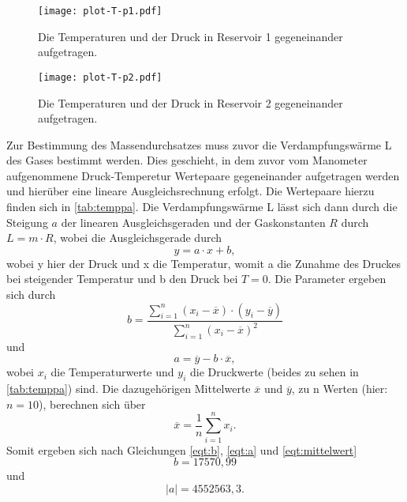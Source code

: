 

\begin{figure}
  \centering
  \texttt{[image: plot-T-p1.pdf]}
  \caption{Die Temperaturen und der Druck in Reservoir 1 gegeneinander aufgetragen.}
  \label{fig:plot_temp-druck1}
\end{figure}

\begin{figure}
  \centering
  \texttt{[image: plot-T-p2.pdf]}
  \caption{Die Temperaturen und der Druck in Reservoir 2 gegeneinander aufgetragen.}
  \label{fig:plot_temp-druck2}
\end{figure}

Zur Bestimmung des Massendurchsatzes muss zuvor die Verdampfungswärme L des Gases bestimmt werden. Dies geschieht, in dem zuvor vom Manometer aufgenommene
Druck-Temperetur Wertepaare gegeneinander aufgetragen werden und hierüber eine lineare Ausgleichsrechnung erfolgt. Die Wertepaare hierzu finden sich in \autoref {tab:temppa}.
Die Verdampfungswärme L lässt sich dann durch die Steigung $a$ der linearen Ausgleichsgeraden und der Gaskonstanten $R$ durch $L = m \cdot R$, wobei die Ausgleichsgerade durch
\begin{equation}
  \label{eqt:Ausgleichsgerade}
  y = a \cdot x + b,
\end{equation}
wobei y hier der Druck und x die Temperatur, womit a die Zunahme des Druckes bei steigender Temperatur und b den Druck bei $ T = 0$.
Die Parameter ergeben sich durch
\begin{equation}
\label{eqt:b}
  b = \frac {\sum_{i=1}^n (x_i - \overline{x}) \cdot (y_i - \overline{y})}{\sum_{i=1}^n (x_i - \overline{x})^2}
\end{equation}
und 
\begin{equation}
\label{eqt:a}
  a = \overline{y} - b \cdot \overline{x}, 
\end{equation}
wobei $x_i$ die Temperaturwerte und $y_i$ die Druckwerte (beides zu sehen in \autoref{tab:temppa}) sind. Die dazugehörigen Mittelwerte $\overline{x}$ und $\overline{y}$, zu n Werten (hier: $n = 10$), berechnen sich über
\begin{equation}
\label{eqt:mittelwert}
  \overline{x} = \frac {1}{n} \sum_{i=1}^n x_i . 
\end{equation}
Somit ergeben sich nach Gleichungen \eqref{eqt:b}, \eqref{eqt:a} und \eqref{eqt:mittelwert}
\begin{equation}
    b = 17570,99
\end{equation}
und 
\begin{equation}
 \lvert a \rvert = 4552563,3 . 
\end{equation}
